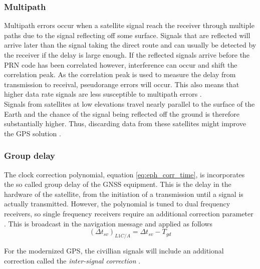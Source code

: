 \subsubsection{Multipath}
\label{sec:multipath}
Multipath errors occur when a satellite signal reach the receiver through multiple paths due to the signal reflecting off some surface. Signals that are reflected will arrive later than the signal taking the direct route and can usually be detected by the receiver if the delay is large enough. If the reflected signals arrive before the PRN code has been correlated however, interference can occur and shift the correlation peak. As the correlation peak is used to measure the delay from transmission to receival, pseudorange errors will occur. This also means that higher data rate signals are less susceptible to multipath errors \cite{groves2013principles}. \\

Signals from satellites at low elevations travel nearly parallel to the surface of the Earth and the chance of the signal being reflected off the ground is therefore substantially higher. Thus, discarding data from these satellites might improve the GPS solution \cite{farrell2008aided, groves2013principles}.

\subsubsection{Group delay}
The clock correction polynomial, equation \ref{eq:eph_corr_time}, is incorporates the so called group delay of the GNSS equipment. This is the delay in the hardware of the satellite, from the initiation of a transmission until a signal is actually transmitted. However, the polynomial is tuned to dual frequency receivers, so single frequency receivers require an additional correction parameter \cite{spec:gps}. This is broadcast in the navigation message and applied as follows
\begin{equation}
    (\Delta t_{sv})_{L1C/A} = \Delta t_{sv} - T_{gd}
\end{equation}

For the modernized GPS, the civillian signals will include an additional correction called the \textit{inter-signal correction} \cite{spec:gps-new}.


